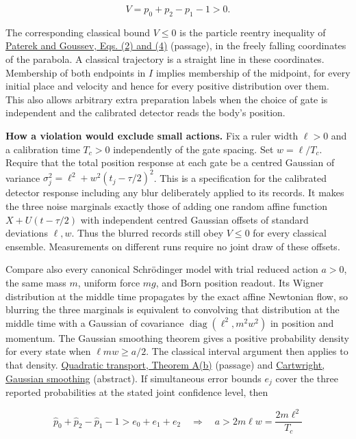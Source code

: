 \documentclass[11pt,a4paper]{article}
\begin{document}
\[V=p_0+p_2-p_1-1>0.\]

The corresponding classical bound \(V\le0\) is the particle reentry
inequality of \href{https://arxiv.org/pdf/2511.10155\#page=2}{Paterek
and Goussev, Eqs. (2) and (4)} (passage), in the freely falling
coordinates of the parabola. A classical trajectory is a straight line
in these coordinates. Membership of both endpoints in \(I\) implies
membership of the midpoint, for every initial place and velocity and
hence for every positive distribution over them. This also allows
arbitrary extra preparation labels when the choice of gate is
independent and the calibrated detector reads the body's position.

\textbf{How a violation would exclude small actions.} Fix a ruler width
\(\ell>0\) and a calibration time \(T_c>0\) independently of the gate
spacing. Set \(w=\ell/T_c\). Require that the total position response at
each gate be a centred Gaussian of variance
\(\sigma_j^2=\ell^2+w^2(t_j-\tau/2)^2\). This is a specification for the
calibrated detector response including any blur deliberately applied to
its records. It makes the three noise marginals exactly those of adding
one random affine function \(X+U(t-\tau/2)\) with independent centred
Gaussian offsets of standard deviations \(\ell,w\). Thus the blurred
records still obey \(V\le0\) for every classical ensemble. Measurements
on different runs require no joint draw of these offsets.

Compare also every canonical Schrödinger model with trial reduced action
\(a>0\), the same mass \(m\), uniform force \(mg\), and Born position
readout. Its Wigner distribution at the middle time propagates by the
exact affine Newtonian flow, so blurring the three marginals is
equivalent to convolving that distribution at the middle time with a
Gaussian of covariance \(\operatorname{diag}(\ell^2,m^2w^2)\) in
position and momentum. The Gaussian smoothing theorem gives a positive
probability density for every state when \(\ell m w\ge a/2\). The
classical interval argument then applies to that density.
\href{principia-fifth-postulate.md}{Quadratic transport, Theorem A(b)}
(passage) and
\href{https://doi.org/10.1016/0378-4371(76)90145-X}{Cartwright, Gaussian
smoothing} (abstract). If simultaneous error bounds \(e_j\) cover the
three reported probabilities at the stated joint confidence level, then

\[
\widehat p_0+\widehat p_2-\widehat p_1-1>e_0+e_1+e_2
\quad\Longrightarrow\quad
a>2m\ell w=\frac{2m\ell^2}{T_c}
\]
\end{document}
